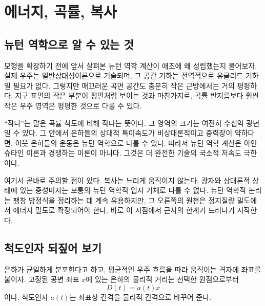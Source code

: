 \chapter{에너지, 곡률, 복사}


\section{뉴턴 역학으로 알 수 있는 것}

모형을 확장하기 전에 앞서 살펴본 뉴턴 역학 계산이 애초에 왜 성립했는지 물어보자. 실제 우주는 일반상대성이론으로 기술되며, 그 공간 기하는 전역적으로 유클리드 기하일 필요가 없다. 그렇지만 매끄러운 곡면 공간도 충분히 작은 근방에서는 거의 평평하다. 지구 표면의 작은 부분이 평면처럼 보이는 것과 마찬가지로, 곡률 반지름보다 훨씬 작은 우주 영역은 평평한 것으로 다룰 수 있다.

``작다''는 말은 곡률 척도에 비해 작다는 뜻이다. 그 영역의 크기는 여전히 수십억 광년일 수 있다. 그 안에서 은하들의 상대적 특이속도가 비상대론적이고 중력장이 약하다면, 이웃 은하들의 운동은 뉴턴 역학으로 다룰 수 있다. 따라서 뉴턴 역학 계산은 아인슈타인 이론과 경쟁하는 이론이 아니다. 그것은 더 완전한 기술의 국소적 저속도 극한이다.

여기서 곧바로 주의할 점이 있다. 복사는 느리게 움직이지 않는다. 광자와 상대론적 상태에 있는 중성미자는 보통의 뉴턴 역학적 입자 기체로 다룰 수 없다. 뉴턴 역학적 논리는 팽창 방정식을 정리하는 데 계속 유용하지만, 그 오른쪽의 원천은 정지질량 밀도에서 에너지 밀도로 확장되어야 한다. 바로 이 지점에서 근사의 한계가 드러나기 시작한다.

\section{척도인자 되짚어 보기}

은하가 균일하게 분포한다고 하고, 평균적인 우주 흐름을 따라 움직이는 격자에 좌표를 붙이자. 고정된 공변 좌표 \(x\)에 있는 은하의 물리적 거리는 선택한 원점으로부터
\begin{equation}
D(t)=a(t)x
\label{eq:c02-distance}
\end{equation}
이다. 척도인자 \(a(t)\)는 좌표상 간격을 물리적 간격으로 바꾸어 준다.

